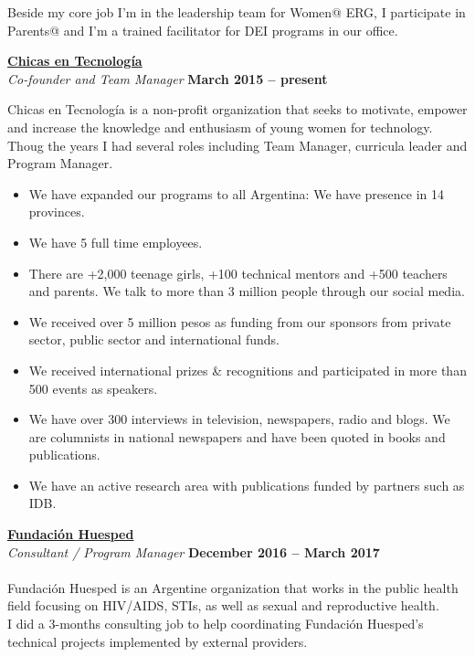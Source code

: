\documentclass[margin,line]{resume}
\begin{document}
\begin{resume}
Beside my core job I'm in the leadership team for Women@ ERG, I participate in Parents@ and I'm a trained facilitator for DEI programs in our office.
 


\textbf{\href{http://www.chicasentecnologia.org/}{Chicas en Tecnolog\'ia}}\\\vspace{1mm}
\textsl{Co-founder and Team Manager} \hfill \textbf{March 2015 -- present}\vspace{-3mm}\\\vspace{-1mm}

Chicas en Tecnolog\'ia is a non-profit organization that seeks to motivate, empower and increase the knowledge and enthusiasm of young women for technology.
Thoug the years I had several roles including Team Manager, curricula leader and Program Manager.

\begin{itemize}

\item We have expanded our programs to all Argentina: We have presence in 14 provinces.

\item We have 5 full time employees.

\item There are +2,000 teenage girls,  +100 technical mentors and +500 teachers and parents. We talk to more than 3 million people through our social media.

\item We received over 5 million pesos as funding from our sponsors from private sector, public sector and international funds.

\item We received international prizes \& recognitions and participated in more than 500 events as speakers. 

\item We have over 300 interviews in television, newspapers, radio and blogs. We are columnists in national newspapers and have been quoted in books and publications.

\item We have an active research area with publications funded by partners such as IDB.

\end{itemize}

\vspace{-5mm}
\textbf{\href{https://www.huesped.org.ar/}{Fundaci\'on Huesped}}\\\vspace{1mm}
\textsl{Consultant / Program Manager} \hfill \textbf{December 2016 -- March 2017}\vspace{-3mm}\\\vspace{-1mm}
\\
Fundaci\'on Huesped is an Argentine organization that works in the public health field focusing on HIV/AIDS, STIs, as well as sexual and reproductive health.
\\
I did a 3-months consulting job to help coordinating Fundaci\'on Huesped's technical projects implemented by external providers.



\end{resume}
\end{document}
